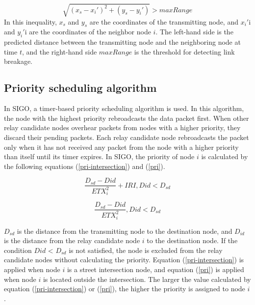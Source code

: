 \documentclass[conference]{IEEEtran}
\begin{document}
\begin{equation}
\label{expired_links}
\sqrt{\left(x_s - x_i'\right)^2 + \left(y_s - y_i'\right)} > maxRange
\end{equation}
In this inequality, $x_s$ and  $y_s$ are the coordinates of the  transmitting node, and $x_i'$i and $y_i'$i are the coordinates of the neighbor node $i$.
The left-hand side is the predicted distance between the transmitting node and the neighboring node at time $t$, and the right-hand side $maxRange$ is the threshold for detecting link breakage.


\subsection{Priority scheduling algorithm}
\label{priority}
In SIGO, a timer-based priority scheduling algorithm is used. 
In this algorithm, the node with the highest priority rebroadcasts the data packet first. 
When other relay candidate nodes overhear packets from nodes with a higher priority, they discard their pending packets. Each relay candidate node rebroadcasts the packet only when it has not received any packet from the node with a higher priority than itself until its timer expires.
In SIGO, the priority of node $i$ is calculated by the following equations (\ref{pri-intersection}) and (\ref{pri}).


\begin{equation}
\label{pri-intersection}
\frac{D_{sd} - D{id}}{ETX_{i}^{2}} + IRI,  D{id} < D_{sd}
\end{equation}

\begin{equation}
\label{pri}
\frac{D_{sd} - D{id}}{ETX_{i}^{2}} ,   D{id} < D_{sd}
\end{equation}

$D_{sd}$ is the distance from the transmitting node to the destination node, and $D_{id}$ is the distance from the relay candidate node $i$ to the destination node. If the condition $D{id}$ < $D_{sd}$ is not satisfied, the node is excluded from the relay candidate nodes without calculating the priority. 
Equation (\ref{pri-intersection}) is applied when node $i$ is a street intersection node, and equation (\ref{pri}) is applied when node $i$ is located outside the intersection. 
The larger the value calculated by equation (\ref{pri-intersection}) or (\ref{pri}), the higher the priority is assigned to node $i$. 
\end{document}
